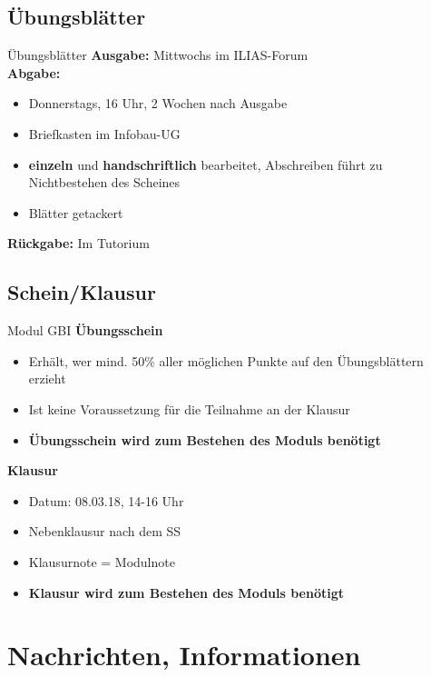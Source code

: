 \subsection{Übungsblätter}
	\begin{frame}{Übungsblätter}
		\textbf{Ausgabe:} Mittwochs im ILIAS-Forum \\
		\pause
		\textbf{Abgabe:}
			\begin{itemize}
				\item Donnerstags, 16 Uhr, 2 Wochen nach Ausgabe %
				\item Briefkasten im Infobau-UG %
				\pause
				\item \textbf{einzeln} und \textbf{handschriftlich} bearbeitet, Abschreiben führt zu Nichtbestehen des Scheines
				\item Blätter getackert
			\end{itemize}
		\pause	
		\textbf{Rückgabe:} Im Tutorium
	\end{frame}
\subsection{Schein/Klausur}
 \begin{frame}{Modul GBI}
		\textbf{Übungsschein}
			\begin{itemize}
				\item Erhält, wer mind. 50\% aller möglichen Punkte auf den Übungsblättern erzieht
				\item Ist keine Voraussetzung für die Teilnahme an der Klausur
				\item \textbf{Übungsschein wird zum Bestehen des Moduls benötigt} 
			\end{itemize}
		\pause	
		\textbf{Klausur}
		\begin{itemize}
				\item Datum: 08.03.18, 14-16 Uhr %
				\item Nebenklausur nach dem SS
				\item Klausurnote = Modulnote
				\item \textbf{Klausur wird zum Bestehen des Moduls benötigt} 
			\end{itemize}
	\end{frame}
	

\section[Nachrichten]{Nachrichten, Informationen}
